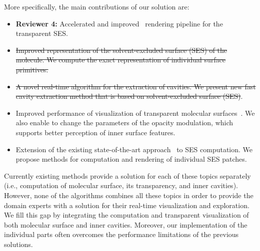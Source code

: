 More specifically, the main contributions of our solution are:
\begin{itemize}
  \item \textbf{Reviewer 4:} Accelerated and improved~\cite{kauker2013rendering} rendering pipeline for the transparent SES.
  \item \sout{Improved representation of the solvent-excluded surface (SES) of the molecule. We compute the exact representation of individual surface primitives.}
  \item \sout{A novel real-time algorithm for the extraction of cavities. We present new fast cavity extraction method that is based on solvent-excluded surface (SES)}.
  \item Improved performance of visualization of transparent molecular surfaces~\cite{kauker2013rendering}. We also enable to change the parameters of the opacity modulation, which supports better perception of inner surface features.
	\item Extension of the existing state-of-the-art approach~\cite{krone2011parallel} to SES computation. We propose methods for computation and rendering of individual SES patches.
\end{itemize}

Currently existing methods provide a solution for each of these topics separately (i.e., computation of molecular surface, its transparency, and inner cavities).
However, none of the algorithms combines all these topics in order to provide the domain experts with a solution for their real-time visualization and exploration.
We fill this gap by integrating the computation and transparent visualization of both molecular surface and inner cavities.
Moreover, our implementation of the individual parts often overcomes the performance limitations of the previous solutions.


